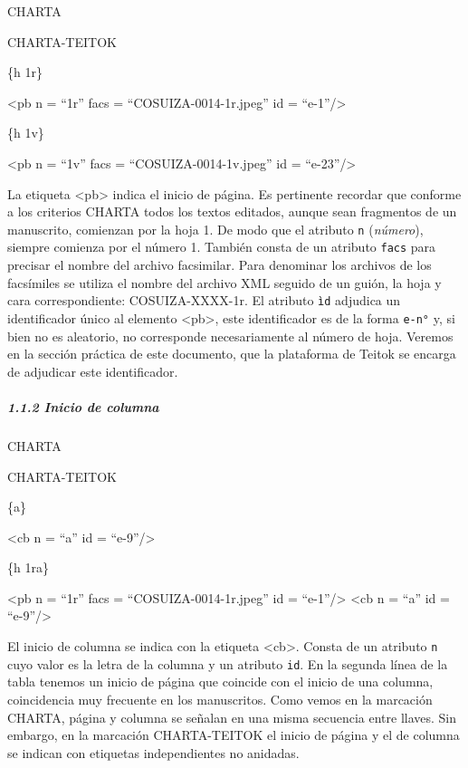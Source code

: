 \documentclass[
]{book}
\begin{document}
CHARTA

CHARTA-TEITOK

\{h 1r\}

{\textless pb} {n} {=} {``1r''} {facs} {=} {``COSUIZA-0014-1r.jpeg''} {id} {=} {``e-1''}{/\textgreater{}}

\{h 1v\}

{\textless pb} {n} {=} {``1v''} {facs} {=} {``COSUIZA-0014-1v.jpeg''} {id} {=} {``e-23''}{/\textgreater{}}

La etiqueta { \textless pb\textgreater{} } indica el inicio de página.
Es pertinente recordar que conforme a los criterios CHARTA todos los textos editados, aunque sean fragmentos de un manuscrito, comienzan por la hoja 1. De modo que el atributo \texttt{n} (\emph{número}), siempre comienza por el número 1. También consta de un atributo \texttt{facs} para precisar el nombre del archivo facsimilar. Para denominar los archivos de los facsímiles se utiliza el nombre del archivo XML seguido de un guión, la hoja y cara correspondiente: COSUIZA-XXXX-1r. El atributo \texttt{ìd} adjudica un identificador único al elemento {\textless pb\textgreater{}}, este identificador es de la forma \texttt{e-n°} y, si bien no es aleatorio, no corresponde necesariamente al número de hoja. Veremos en la sección práctica de este documento, que la plataforma de Teitok se encarga de adjudicar este identificador.

\hypertarget{inicio-de-columna}{%
\subparagraph*{1.1.2 Inicio de columna}\label{inicio-de-columna}}

CHARTA

CHARTA-TEITOK

\{a\}

{\textless cb} {n} {=} {``a''} {id} {=} {``e-9''}{/\textgreater{}}

\{h 1ra\}

{\textless pb} {n} {=} {``1r''} {facs} {=} {``COSUIZA-0014-1r.jpeg''} {id} {=} {``e-1''}{/\textgreater{}} {\textless cb} {n} {=} {``a''} {id} {=} {``e-9''}{/\textgreater{}}

El inicio de columna se indica con la etiqueta {\textless cb\textgreater{}}. Consta de un atributo \texttt{n} cuyo valor es la letra de la columna y un atributo \texttt{id}. En la segunda línea de la tabla tenemos un inicio de página que coincide con el inicio de una columna, coincidencia muy frecuente en los manuscritos. Como vemos en la marcación CHARTA, página y columna se señalan en una misma secuencia entre llaves. Sin embargo, en la marcación CHARTA-TEITOK el inicio de página y el de columna se indican con etiquetas independientes no anidadas.
\end{document}
